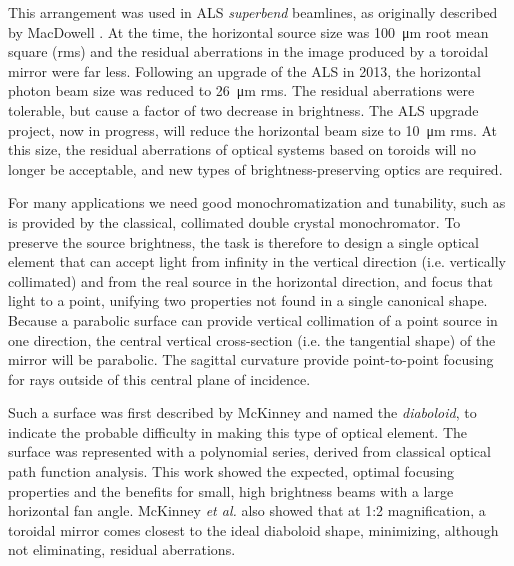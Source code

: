 \documentclass[preprint]{iucr}       %
\newcommand{\inred}[1]{{\color{red}#1}}
\begin{document}
This arrangement was used in ALS \emph{superbend} beamlines, as originally described by MacDowell \cite{MacDowell2004}. At the time, the horizontal source size was \SI{100}{\micro\meter} root mean square (rms) and the residual aberrations in the image produced by a toroidal mirror were far less. Following an upgrade of the ALS in 2013, the horizontal photon beam size was reduced \cite{Steier_2014} to \SI{26}{\micro\meter} rms. The residual aberrations were tolerable, but cause a factor of two decrease in brightness. The ALS upgrade project, now in progress, will reduce the horizontal beam size to
\SI{10}{\micro\meter} rms. At this size, the residual aberrations of optical systems based on toroids will no longer be acceptable, and new types of brightness-preserving optics are required.

For many applications we need good monochromatization and tunability, such as is provided by the classical, collimated double crystal monochromator. To preserve the source brightness, the task is therefore to design a single optical element that can accept light from infinity in the vertical direction (i.e. vertically collimated) and from the real source in the horizontal direction, and focus that light to a point, unifying two properties not found in a single canonical shape.
Because a parabolic surface can provide vertical collimation of a point source in one direction, the central vertical cross-section (i.e. the tangential shape) of the mirror will be parabolic. The sagittal curvature provide point-to-point focusing for rays outside of this central plane of incidence.

Such a surface was first described by McKinney \cite{McKinneySPIE2009} and named the \emph{diaboloid}, to indicate the probable difficulty in making this type of optical element. The surface was represented with a polynomial series, derived from classical optical path function analysis. This work showed the expected, optimal focusing properties and the benefits for small, high brightness beams with a large horizontal fan angle. McKinney {\it et al.} also showed that at 1:2 magnification, a toroidal mirror comes closest to the ideal diaboloid shape, minimizing, although not eliminating, residual aberrations.
\end{document}
